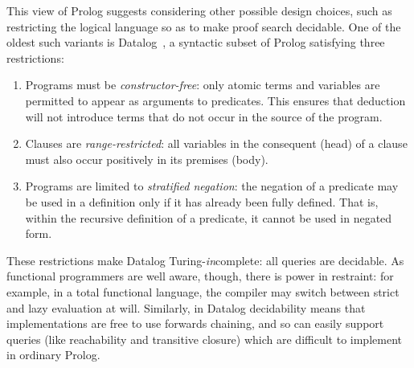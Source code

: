 This view of Prolog suggests considering other possible design choices, such as
restricting the logical language so as to make proof search decidable. One of
the oldest such variants is Datalog~\cite{datalog}, a syntactic subset of Prolog
satisfying three restrictions:

\begin{enumerate}
\item Programs must be \emph{constructor-free}: only atomic terms and variables
  are permitted to appear as arguments to predicates. This ensures that deduction
  will not introduce terms that do not occur in the source of the
  program.

\item Clauses are \emph{range-restricted}: all variables in the
  consequent (head) of a clause must also occur positively in its
  premises (body).

\item Programs are limited to \emph{stratified negation}: the
  negation of a predicate may be used in a definition only if it has
  already been fully defined. That is, within the recursive
  definition of a predicate, it cannot be used in negated form.
\end{enumerate}

These restrictions make Datalog Turing-\emph{in}complete: all queries are
decidable. As functional programmers are well aware, though, there is power in
restraint: for example, in a total functional language, the compiler may switch
between strict and lazy evaluation at will. Similarly, in Datalog decidability
means that implementations are free to use forwards chaining, and so can easily
support queries (like reachability and transitive closure) which are difficult
to implement in ordinary Prolog.

%

